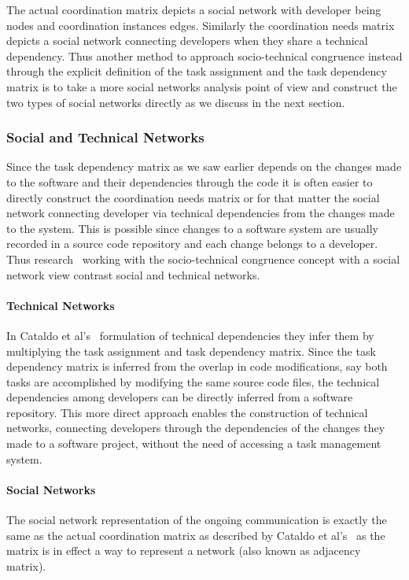 The actual coordination matrix depicts a social network with developer being nodes and coordination instances edges.
Similarly the coordination needs matrix depicts a social network connecting developers when they share a technical dependency.
Thus another method to approach socio-technical congruence instead through the explicit definition of the task assignment and the task dependency matrix is to take a more social networks analysis point of view and construct the two types of social networks directly as we discuss in the next section.

\subsubsection{Social and Technical Networks}
Since the task dependency matrix as we saw earlier depends on the changes made to the software and their dependencies through the code it is often easier to directly construct the coordination needs matrix or for that matter the social network connecting developer via technical dependencies from the changes made to the system.
This is possible since changes to a software system are usually recorded in a source code repository and each change belongs to a developer.
Thus research~\cite{cataldo:cscw:2006,kwan:tse:2011,valetto:msr:2007,ducheneaut:cscw:2005,ehrlich:stc:2008} working with the socio-technical congruence concept with a social network view contrast social and technical networks.

\paragraph{Technical Networks}
In Cataldo et al's~\cite{cataldo:cscw:2006} formulation of technical dependencies they infer them by multiplying the task assignment and task dependency matrix.
Since the task dependency matrix is inferred from the overlap in code modifications, say both tasks are accomplished by modifying the same source code files, the technical dependencies among developers can be directly inferred from a software repository.
This more direct approach enables the construction of technical networks, connecting developers through the dependencies of the changes they made to a software project, without the need of accessing a task management system.

\paragraph{Social Networks}
The social network representation of the ongoing communication is exactly the same as the actual coordination matrix as described by Cataldo et al's~\cite{cataldo:cscw:2006} as the matrix is in effect a way to represent a network (also known as adjacency matrix).

